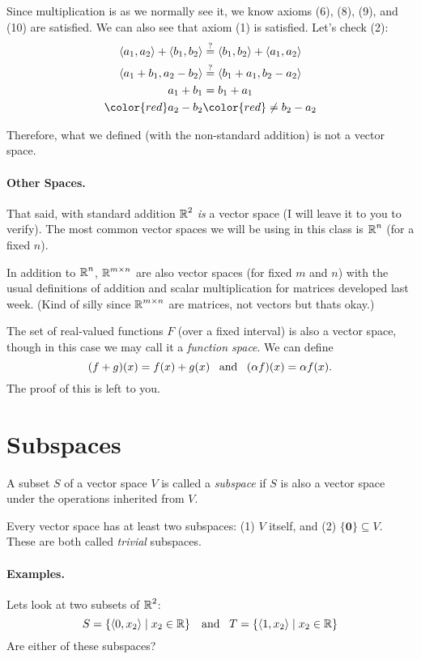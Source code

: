Since multiplication is as we normally see it, we know axioms (6), (8), (9), and (10) are satisfied. 
We can also see that axiom (1) is satisfied.
Let's check (2): 
\[\begin{aligned}
\langle a_1,a_2\rangle + \langle b_1, b_2\rangle & \stackrel{?}{=}  \langle b_1, b_2\rangle + \langle a_1,a_2\rangle\\
\langle a_1+b_1, a_2-b_2\rangle & \stackrel{?}{=}  \langle b_1+a_1, b_2-a_2\rangle\\
a_1+b_1 & =  b_1+a_1\\
\color{red} a_2-b_2& \color{red}\ne  b_2-a_2\\
\end{aligned}\]

Therefore, what we defined (with the non-standard addition) is not a vector space. 


\paragraph{Other Spaces.} 
That said, with standard addition $\operatorname{\mathbb{R}}^2$ \emph{is} a vector space (I will leave it to you to verify).
The most common vector spaces we will be using in this class is $\operatorname{\mathbb{R}}^n$ (for a fixed $n$).

In addition to $\operatorname{\mathbb{R}}^n$, $\operatorname{\mathbb{R}}^{m\times n}$ are also vector spaces (for fixed $m$ and $n$)
with the usual definitions of addition and scalar multiplication for matrices developed last week. 
(Kind of silly since $\operatorname{\mathbb{R}}^{m\times n}$ are matrices, not vectors but thats okay.)

The set of real-valued functions $F$ (over a fixed interval) is also a vector space, 
though in this case we may call it a \emph{function space}. 
We can define 
\[(f+g)(x) = f(x) + g(x) \;\;\;\textnormal{and}\;\;\; (\alpha f)(x) = \alpha f(x).\]
The proof of this is left to you. 

\section{Subspaces}
A subset $S$ of a vector space $V$ is called a \emph{subspace} if $S$ is also a vector space under the operations inherited from $V$. 

Every vector space has at least two subspaces: (1) $V$ itself, and (2) $\{\mathbf{0}\}\subseteq V$. 
These are both called \textit{trivial} subspaces. 

\paragraph{Examples.} 
Lets look at two subsets of $\operatorname{\mathbb{R}}^2$:
\[S = \left\{\left\langle 0, x_2\right\rangle \mid x_2 \in \operatorname{\mathbb{R}}\right\} \;\;\;\textnormal{and}\;\;\;
T = \left\{\left\langle 1, x_2\right\rangle \mid x_2 \in \operatorname{\mathbb{R}}\right\}\]
Are either of these subspaces? 

